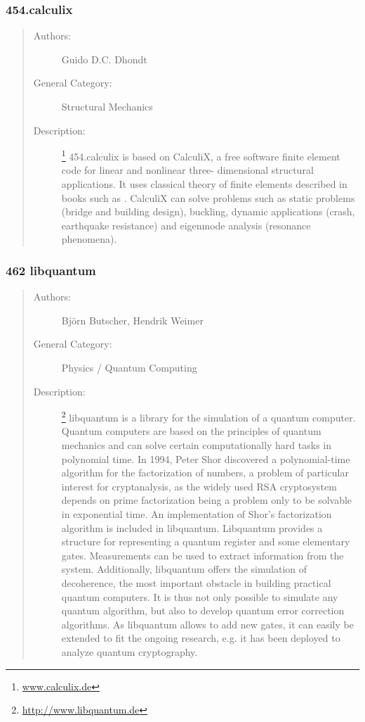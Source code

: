 \documentclass[onecolumn, openright, master, english, signatures]{dbrgrptt}
\begin{document}
\subsubsection{454.calculix}

\begin{quote}
\begin{description}
\item[Authors:] Guido D.C. Dhondt

\item[General Category:] Structural Mechanics

\item[Description:]\footnote{\url{www.calculix.de}} 454.calculix is based on CalculiX, a free software finite element code for linear and nonlinear three- dimensional structural applications. It uses classical theory of finite elements described in books such as \cite{zienkiewicz1977finite}. CalculiX can solve problems such as static problems (bridge and building design), buckling, dynamic applications (crash, earthquake resistance) and eigenmode analysis (resonance phenomena).
\end{description}
\end{quote}

\subsubsection{462 libquantum}

\begin{quote}
\begin{description}
\item[Authors:] Bj\"orn Butscher, Hendrik Weimer

\item[General Category:] Physics / Quantum Computing

\item[Description:]\footnote{\url{http://www.libquantum.de}} libquantum is a library for the simulation of a quantum computer. Quantum computers are based on the principles of quantum mechanics and can solve certain computationally hard tasks in polynomial time.
In 1994, Peter Shor discovered a polynomial-time algorithm for the factorization of numbers, a problem of particular interest for cryptanalysis, as the widely used RSA cryptosystem depends on prime factorization being a problem only to be solvable in exponential time. An implementation of Shor's factorization algorithm is included in libquantum.
Libquantum provides a structure for representing a quantum register and some elementary gates. Measurements can be used to extract information from the system. Additionally, libquantum offers the simulation of decoherence, the most important obstacle in building practical quantum computers. It is thus not only possible to simulate any quantum algorithm, but also to develop quantum error correction algorithms. As libquantum allows to add new gates, it can easily be extended to fit the ongoing research, e.g. it has been deployed to analyze quantum cryptography.
\end{description}
\end{quote}
\end{document}
